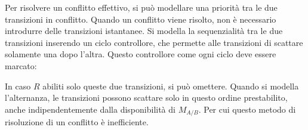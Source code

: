 \documentclass{article}
\numberwithin{equation}{subsection}
\begin{document}
Per risolvere un conflitto effettivo, si può modellare una priorità tra le due transizioni in conflitto. Quando un conflitto viene risolto, non è necessario 
introdurre delle transizioni istantanee. 
Si modella la sequenzialità tra le due transizioni inserendo un ciclo controllore, che permette alle transizioni di scattare solamente una dopo l'altra. Questo 
controllore come ogni ciclo deve essere marcato: 

\begin{center}
\end{center}

In caso $R$ abiliti solo queste due transizioni, si può omettere. Quando si modella l'alternanza, le transizioni possono scattare solo in questo ordine prestabilito, anche 
indipendentemente dalla disponibilità di $M_{A/B}$. Per cui questo metodo di risoluzione di un conflitto è inefficiente. 
\end{document}
